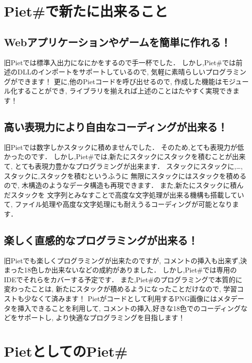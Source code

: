 \section{Piet\#で新たに出来ること}

\subsection{Webアプリケーションやゲームを簡単に作れる！}

旧Pietでは標準入出力になにかをするので手一杯でした．
しかし,Piet\#では前述のDLLのインポートをサポートしているので,
気軽に素晴らしいプログラミングができます！
更に,他のPietコードを呼び出せるので,
作成した機能はモジュール化することができ,
ライブラリを揃えれば上述のことはたやすく実現できます！

\subsection{高い表現力により自由なコーディングが出来る！}

旧Pietでは数字しかスタックに積めませんでした．
そのため,とても表現力が低かったのです．
しかし,Piet\#では,新たにスタックにスタックを積むことが出来て,
とても表現力豊かなプログラミングが出来ます．
スタックにスタックに,\ldots{},スタックに,スタックを積むというふうに
無限にスタックにはスタックを積めるので,
木構造のようなデータ構造も再現できます．
また,新たにスタックに積んだスタックを
文字列とみなすことで高度な文字処理が出来る機構も搭載していて,
ファイル処理や高度な文字処理にも耐えうるコーディングが可能となります．

\subsection{楽しく直感的なプログラミングが出来る！}

旧Pietでも楽しくプログラミングが出来たのですが,
コメントの挿入も出来ず,決まった18色しか出来ないなどの成約がありました．
しかし,Piet\#では専用のIDEでそれらをカバーする予定です．
また,Piet\#のプログラミングで本質的に変わったことは,
新たにスタックが積めるようになったことだけなので,
学習コストも少なくて済みます！
Pietがコードとして利用するPNG画像にはメタデータを挿入できることを利用して,
コメントの挿入,好きな18色でのコーディングなどをサポートし,
より快適なプログラミングを目指します！

\section{PietとしてのPiet\#}

